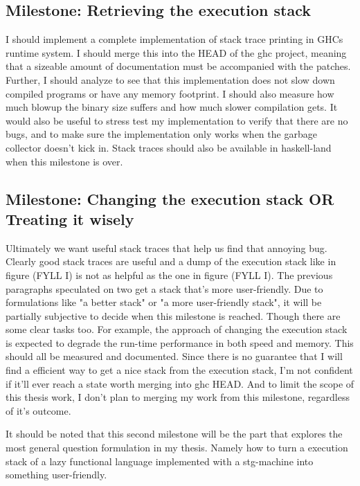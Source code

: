 \subsection{Milestone: Retrieving the execution stack}

I should implement a complete implementation of stack trace printing in GHCs
runtime system. I should merge this into the HEAD of the ghc project, meaning
that a sizeable amount of documentation must be accompanied with the patches.
Further, I should analyze to see that this implementation does not slow down
compiled programs or have any memory footprint. I should also measure how much
blowup the binary size suffers and how much slower compilation gets. It would
also be useful to stress test my implementation to verify that there are no
bugs, and to make sure the implementation only works when the garbage collector
doesn't kick in. Stack traces should also be available in haskell-land when this
milestone is over.


\subsection{Milestone: Changing the execution stack OR Treating it wisely}

Ultimately we want useful stack traces that help us find that annoying bug.
Clearly good stack traces are useful and a dump of the execution stack like in
figure (FYLL I) is not as helpful as the one in figure (FYLL I). The previous
paragraphs speculated on two get a stack that's more user-friendly. Due to
formulations like "a better stack" or "a more user-friendly stack", it will be
partially subjective to decide when this milestone is reached. Though there are
some clear tasks too. For example, the approach of changing the execution stack
is expected to degrade the run-time performance in both speed and memory. This
should all be measured and documented. Since there is no guarantee that I will
find a efficient way to get a nice stack from the execution stack, I'm not
confident if it'll ever reach a state worth merging into ghc HEAD. And to limit
the scope of this thesis work, I don't plan to merging my work from this
milestone, regardless of it's outcome.

It should be noted that this second milestone will be the part that explores the
most general question formulation in my thesis. Namely how to turn a execution
stack of a lazy functional language implemented with a stg-machine into
something user-friendly.

